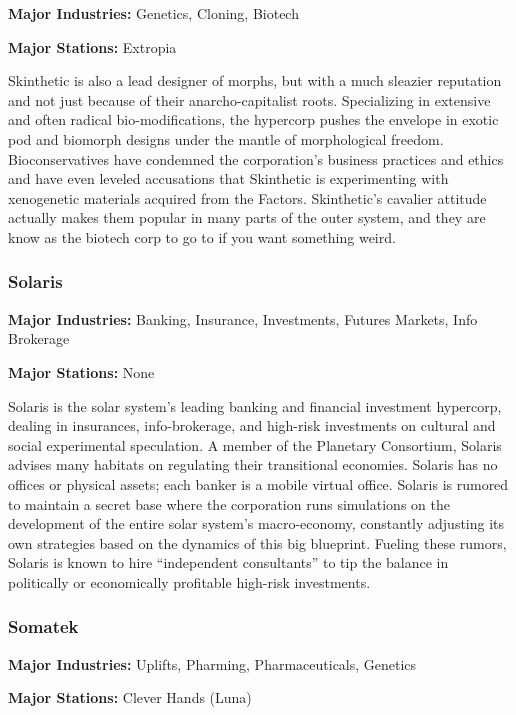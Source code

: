 \textbf{Major Industries:} Genetics, Cloning, Biotech 

\textbf{Major Stations:} Extropia 

Skinthetic is also a lead designer of morphs, but with a much sleazier reputation and not just because of their anarcho-capitalist roots. Specializing in extensive and often radical bio-modifications, the hypercorp pushes the envelope in exotic pod and biomorph designs under the mantle of morphological freedom. Bioconservatives have condemned the corporation's business practices and ethics and have even leveled accusations that Skinthetic is experimenting with xenogenetic materials acquired from the Factors. Skinthetic's cavalier attitude actually makes them popular in many parts of the outer system, and they are know as the biotech corp to go to if you want something weird. 

\subsubsection{Solaris} \label{sec:solaris} 

\textbf{Major Industries:} Banking, Insurance, Investments, Futures Markets, Info Brokerage 

\textbf{Major Stations:} None 

Solaris is the solar system's leading banking and financial investment hypercorp, dealing in insurances, info-brokerage, and high-risk investments on cultural and social experimental speculation. A member of the Planetary Consortium, Solaris advises many habitats on regulating their transitional economies. Solaris has no offices or physical assets; each banker is a mobile virtual office. Solaris is rumored to maintain a secret base where the corporation runs simulations on the development of the entire solar system's macro-economy, constantly adjusting its own strategies based on the dynamics of this big blueprint. Fueling these rumors, Solaris is known to hire “independent consultants” to tip the balance in politically or economically profitable high-risk investments. 

\subsubsection{Somatek} \label{sec:somatek} 

\textbf{Major Industries:} Uplifts, Pharming, Pharmaceuticals, Genetics 

\textbf{Major Stations:} Clever Hands (Luna) 

